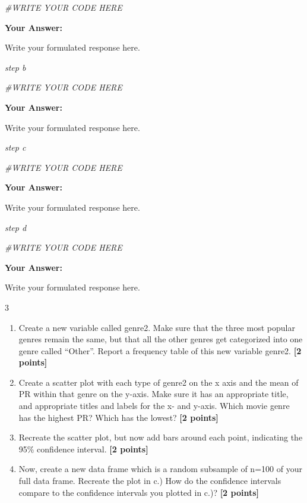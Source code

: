 \documentclass[
]{article}
\newenvironment{Shaded}{\begin{snugshade}}{\end{snugshade}}
\newcommand{\CommentTok}[1]{\textcolor[rgb]{0.56,0.35,0.01}{\textit{#1}}}
\providecommand{\tightlist}{%
  \setlength{\itemsep}{0pt}\setlength{\parskip}{0pt}}
\begin{document}
\begin{Shaded}
\begin{Highlighting}[]
\CommentTok{\#WRITE YOUR CODE HERE}
\end{Highlighting}
\end{Shaded}

\textbf{Your Answer:}

Write your formulated response here.

\emph{step b}

\begin{Shaded}
\begin{Highlighting}[]
\CommentTok{\#WRITE YOUR CODE HERE}
\end{Highlighting}
\end{Shaded}

\textbf{Your Answer:}

Write your formulated response here.

\emph{step c}

\begin{Shaded}
\begin{Highlighting}[]
\CommentTok{\#WRITE YOUR CODE HERE}
\end{Highlighting}
\end{Shaded}

\textbf{Your Answer:}

Write your formulated response here.

\emph{step d}

\begin{Shaded}
\begin{Highlighting}[]
\CommentTok{\#WRITE YOUR CODE HERE}
\end{Highlighting}
\end{Shaded}

\textbf{Your Answer:}

Write your formulated response here.

3

\begin{enumerate}
\def\labelenumi{\alph{enumi}.}
\tightlist
\item
  Create a new variable called genre2. Make sure that the three most
  popular genres remain the same, but that all the other genres get
  categorized into one genre called ``Other''. Report a frequency table
  of this new variable genre2. \textbf{[2 points]}
\item
  Create a scatter plot with each type of genre2 on the x axis and the
  mean of PR within that genre on the y-axis. Make sure it has an
  appropriate title, and appropriate titles and labels for the x- and
  y-axis. Which movie genre has the highest PR? Which has the lowest?
  \textbf{[2 points]}
\item
  Recreate the scatter plot, but now add bars around each point,
  indicating the 95\% confidence interval. \textbf{[2 points]}
\item
  Now, create a new data frame which is a random subsample of n=100 of
  your full data frame. Recreate the plot in c.) How do the confidence
  intervals compare to the confidence intervals you plotted in c.)?
  \textbf{[2 points]}
\end{enumerate}
\end{document}
